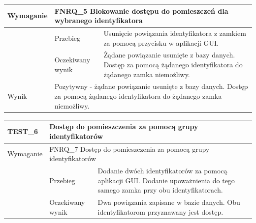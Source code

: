 \begin{table}[h!]
\begin{subtable}[c]{\textwidth}
\begin{tabular}{|p{2cm}|p{}|p{}|}
                    \cellcolor[gray]{0.8} Wymaganie             & \multicolumn{2}{p{12cm}|}{FNRQ\_5 Blokowanie dostępu do pomieszczeń dla wybranego identyfikatora }                                                                                    \\ \hline
                    \cellcolor[gray]{0.8} \multirow{2}{*}{Opis} & Przebieg           & Usunięcie powiązania identyfikatora z zamkiem za pomocą przycisku w aplikacji GUI.  \\ \cline{2-3}
                    \cellcolor[gray]{0.8}                      & Oczekiwany wynik   & Żądane powiązanie usunięte z bazy danych. Dostęp za pomocą żądanego identyfikatora do żądanego zamka niemożliwy.                                                 \\ \hline
                    \cellcolor[gray]{0.8} Wynik                 & \multicolumn{2}{p{12cm}|}{Pozytywny - żądane powiązanie usunięte z bazy danych. Dostęp za pomocą żądanego identyfikatora do żądanego zamka niemożliwy.}                                                                                  \\ \hline
                    \end{tabular}%
                \label{tbl:test5}
                \vspace{10mm}
            \end{subtable}
        \quad%
            \begin{subtable}[c]{\textwidth}
                \centering
                    \begin{tabular}{|p{2cm}|p{}|p{}|}
                    \hline
                    TEST\_6               & \multicolumn{2}{p{12cm}|}{\textbf{Dostęp do pomieszczenia za pomocą grupy identyfikatorów}}                                                            \\ \hline
                    \cellcolor[gray]{0.8} Wymaganie             & \multicolumn{2}{p{12cm}|}{FNRQ\_7 Dostęp do pomieszczenia za pomocą grupy identyfikatorów }                                                                                    \\ \hline
                    \cellcolor[gray]{0.8} \multirow{2}{*}{Opis} & Przebieg           & Dodanie dwóch identyfikatorów za pomocą aplikacji GUI. Dodanie upoważnienia do tego samego zamka przy obu identyfikatorach.  \\ \cline{2-3}
                    \cellcolor[gray]{0.8}                      & Oczekiwany wynik   & Dwa powiązania zapisane w bazie danych. Obu identyfikatorom przyznawany jest dostęp.                                                 \\ \hline

\end{tabular}
\end{subtable}
\end{table}
